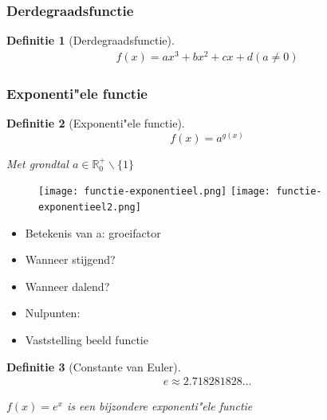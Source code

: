 \documentclass{article}
\newtheorem{theorem}{Definitie}[section]
\begin{document}
\subsubsection{Derdegraadsfunctie}

\begin{theorem}[Derdegraadsfunctie]
\begin{equation}
    \begin{aligned}
        f(x) = ax^3 + bx^2 + cx + d
        (a \neq 0)
    \end{aligned}
\end{equation}


\end{theorem}

\subsubsection{Exponenti"ele functie}

\begin{theorem}[Exponenti"ele functie]
\begin{equation}
    f(x) = a^{g(x)}
\end{equation}

Met grondtal $a \in \mathbb{R}_0^+ \backslash \{1\}$
\end{theorem}

\begin{figure}[H]
    \centering
    \texttt{[image: functie-exponentieel.png]}
    \texttt{[image: functie-exponentieel2.png]}
\end{figure}


\begin{itemize}
    \item Betekenis van a: groeifactor
    \item Wanneer stijgend? 
    \item Wanneer dalend? 
    \item Nulpunten: 
    \item Vaststelling beeld functie
\end{itemize}



\begin{theorem}[Constante van Euler]

\begin{equation}
    \begin{aligned}
        e \approx 2.718281828\dots
    \end{aligned}
\end{equation}

$f(x) = e^x$ is een bijzondere exponenti"ele functie
\end{theorem}
\end{document}
